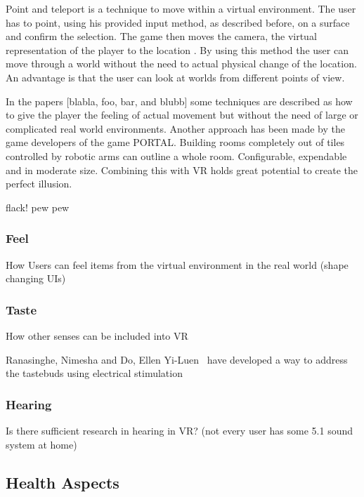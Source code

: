 Point and teleport is a technique to move within a virtual environment. The user has to point, using his provided input method, as described before, on a surface and confirm the selection. The game then moves the camera, the virtual representation of the player to the location . By using this method the user can move through a world without the need to actual physical change of the location. An advantage is that the user can look at worlds from different points of view. 

In the papers [blabla, foo, bar, and blubb] some techniques are described as how to give the player the feeling of actual movement but without the need of large or complicated real world environments. 
Another approach has been made by the game developers of the game PORTAL. Building rooms completely out of tiles controlled by robotic arms can outline a whole room. Configurable, expendable and in moderate size. Combining this with VR holds great potential to create the perfect illusion.

flack! pew pew

\subsubsection{Feel}
How Users can feel items from the virtual environment in the real world (shape changing UIs)

\subsubsection{Taste}
How other senses can be included into VR

Ranasinghe, Nimesha and Do, Ellen Yi-Luen~\cite{Ranasinghe:2016:VSS:2984751.2985729} have developed a way to address the tastebuds using electrical stimulation


\subsubsection{Hearing}
Is there sufficient research in hearing in VR? (not every user has some 5.1 sound system at home)

\subsection{Health Aspects}

